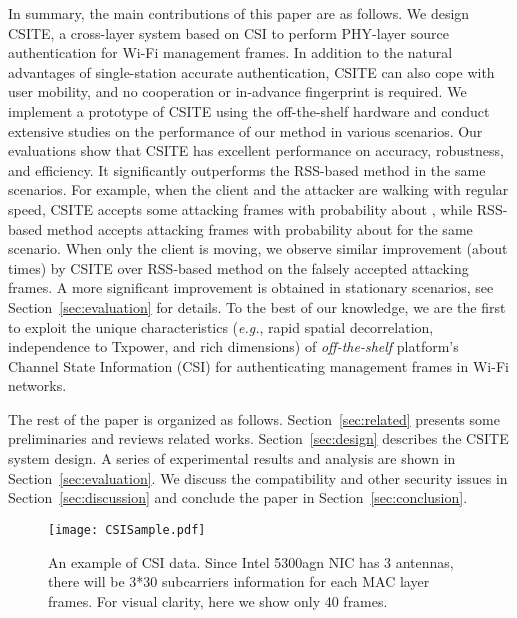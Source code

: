 \documentclass[conference]{IEEEtran}
\def\eg{\textit{e.g.}\xspace}
\begin{document}
In summary, the main contributions of this paper are as follows.
We design CSITE, a cross-layer system based on CSI to perform
  PHY-layer source authentication for Wi-Fi management frames.
In addition to  the natural advantages of single-station accurate
 authentication,   CSITE can also cope with user mobility, and no
 cooperation or in-advance fingerprint is required.
We implement a prototype of CSITE using the off-the-shelf hardware and
 conduct extensive studies on the performance of our method in various
 scenarios.
Our evaluations show  that CSITE has excellent performance on
 accuracy, robustness, and efficiency.
It significantly outperforms the RSS-based method in the same
scenarios.
For example, when the client  and the attacker are
 walking with regular speed, CSITE
 accepts  some attacking frames with probability about , while
 RSS-based method accepts attacking frames with probability about
  for the same scenario.
When only the client is moving, we observe similar improvement (about
  times) by CSITE over RSS-based method on the falsely accepted
 attacking frames.
A more significant improvement is obtained in stationary scenarios, see Section~\ref{sec:evaluation} for details.
To the best of our knowledge,
 we are the first to exploit the unique characteristics (\eg, rapid spatial
  decorrelation, independence to Txpower, and rich dimensions)
  of \emph{off-the-shelf} platform's Channel State Information (CSI)
  for authenticating management frames in Wi-Fi networks.

The rest of the paper is organized as follows.
Section~\ref{sec:related} presents some preliminaries and reviews
related works.
Section~\ref{sec:design} describes the CSITE system design.
A series of experimental results
 and analysis are shown in Section~\ref{sec:evaluation}.
We discuss the compatibility and other security issues in
Section~\ref{sec:discussion} and conclude the paper in
Section~\ref{sec:conclusion}.


\begin{figure}[t]
\begin{center}
\texttt{[image: CSISample.pdf]}

\caption{An example of CSI data. Since Intel 5300agn NIC has 3
  antennas, there will be 3*30 subcarriers information for each MAC
  layer frames.  For visual clarity, here we show only 40
  frames. }
\label{fig:csisample}
\end{center}
\vspace{-0.1in}
\end{figure}
\end{document}
